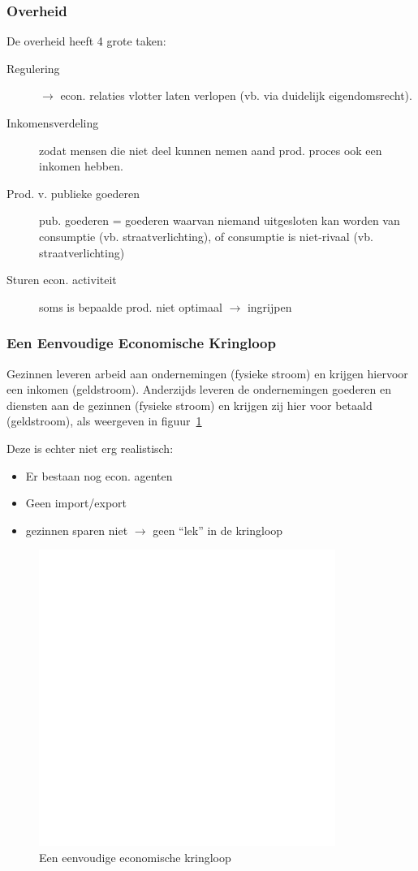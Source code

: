 \subsubsection{Overheid}
De overheid heeft 4 grote taken:
\begin{description}
	\item[Regulering] $\rightarrow$ econ. relaties vlotter laten verlopen (vb. via duidelijk eigendomsrecht).
    \item[Inkomensverdeling] zodat mensen die niet deel kunnen nemen aand prod. proces ook een inkomen hebben.
    \item[Prod. v. publieke goederen] pub. goederen = goederen waarvan niemand uitgesloten kan worden van consumptie (vb. straatverlichting), of consumptie is niet-rivaal (vb. straatverlichting)
    \item[Sturen econ. activiteit] soms is bepaalde prod. niet optimaal $\rightarrow$ ingrijpen
\end{description}

\subsubsection{Een Eenvoudige Economische Kringloop}
Gezinnen leveren arbeid aan ondernemingen (fysieke stroom) en krijgen hiervoor een inkomen (geldstroom). Anderzijds leveren de ondernemingen goederen en diensten aan de gezinnen (fysieke stroom) en krijgen zij hier voor betaald (geldstroom), als weergeven in figuur~\ref{fig:eenvoudigeEconomischeKringloop}

Deze is echter niet erg realistisch:
\begin{itemize}
	\item Er bestaan nog econ. agenten
    \item Geen import/export
    \item gezinnen sparen niet $\rightarrow$ geen ``lek'' in de kringloop
\end{itemize}

\begin{figure}[htbp]
	\centering
	\includegraphics[scale=0.4]{Images/white.png}
	\caption{Een eenvoudige economische kringloop}
	\label{fig:eenvoudigeEconomischeKringloop}
\end{figure}



